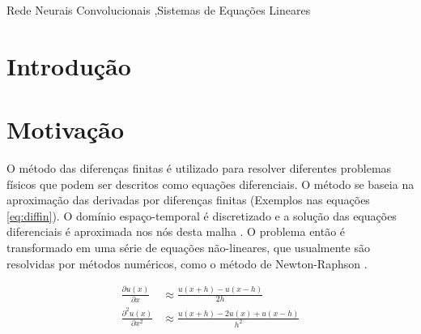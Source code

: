 \documentclass[final,5p]{elsarticle}
\numberwithin{equation}{section}
\begin{document}
\begin{frontmatter}


\begin{keyword}
    Rede Neurais Convolucionais \sep Sistemas de Equações Lineares



\end{keyword}

\end{frontmatter}

\section{Introdução}



\section{Motivação}

    O método das diferenças finitas é utilizado para resolver diferentes problemas físicos que podem ser descritos como equações diferenciais. O método se baseia na aproximação das derivadas por diferenças finitas (Exemplos nas equações \ref{eq:diffin}). O domínio espaço-temporal é discretizado e a solução das equações diferenciais é aproximada nos nós desta malha \cite{causon2010introductory}. O problema então é transformado em uma série de equações não-lineares, que usualmente são resolvidas por métodos numéricos, como o método de Newton-Raphson \cite{burden2016analise}.

    \begin{subequations}
        \begin{align}
            \frac{\partial u(x)}{\partial x} &\approx \frac{u(x+h) - u(x-h)}{2h} \\
            \frac{\partial^2 u(x)}{\partial x^2} &\approx \frac{u(x+h) - 2u(x) + u(x-h)}{h^2}
        \end{align}
        \label{eq:diffin}
    \end{subequations}
\end{document}
